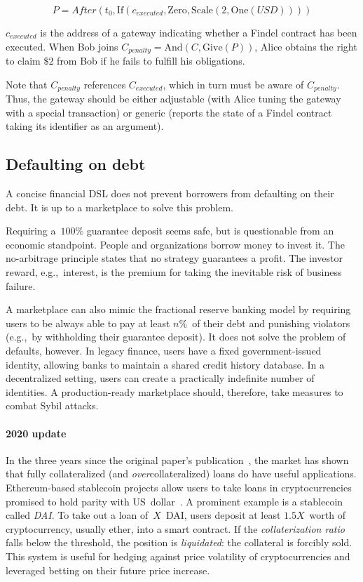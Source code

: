 \[P=After(t_0,\mathrm{If}(c_{executed},\mathrm{Zero},\mathrm{Scale}(2,\mathrm{One}(USD))))\]

\(c_{executed}\) is the address of a gateway indicating whether a Findel contract has been executed.
When Bob joins \(C_{penalty}=\mathrm{And}(C,\mathrm{Give}(P))\), Alice obtains the right to claim $\$2$ from Bob if he fails to fulfill his obligations.

Note that \(C_{penalty}\) references \(C_{executed}\), which in turn must be aware of \(C_{penalty}\).
Thus, the gateway should be either adjustable (with Alice tuning the gateway with a special transaction) or generic (reports the state of a Findel contract taking its identifier as an argument).


\subsection{Defaulting on debt}

A concise financial DSL does not prevent borrowers from defaulting on their debt.
It is up to a marketplace to solve this problem.

Requiring a~$100\%$ guarantee deposit seems safe, but is questionable from an economic standpoint.
People and organizations borrow money to invest it.
The no-arbitrage principle states that no strategy guarantees a profit.
The investor reward, e.g.,~interest, is the premium for taking the inevitable risk of business failure.

A marketplace can also mimic the fractional reserve banking model by requiring users to be always able to pay at least $n\%$~of their debt and punishing violators (e.g.,~by withholding their guarantee deposit).
It does not solve the problem of defaults, however.
In legacy finance, users have a fixed government-issued identity, allowing banks to maintain a shared credit history database.
In a decentralized setting, users can create a practically indefinite number of identities.
A production-ready marketplace should, therefore, take measures to combat Sybil attacks.

\paragraph{2020 update}
In the three years since the original paper's publication~\cite{Biryukov2017}, the market has shown that fully collateralized (and \textit{over}collateralized) loans do have useful applications.
Ethereum-based stablecoin projects allow users to take loans in cryptocurrencies promised to hold parity with US~dollar~\cite{Mita2019}.
A prominent example is a stablecoin called \textit{DAI}.
To take out a loan of~$X$~DAI, users deposit at least $1.5X$~worth of cryptocurrency, usually ether, into a smart contract.
If the \textit{collaterization ratio} falls below the threshold, the position is \textit{liquidated}: the collateral is forcibly sold.
This system is useful for hedging against price volatility of cryptocurrencies and leveraged betting on their future price increase.


